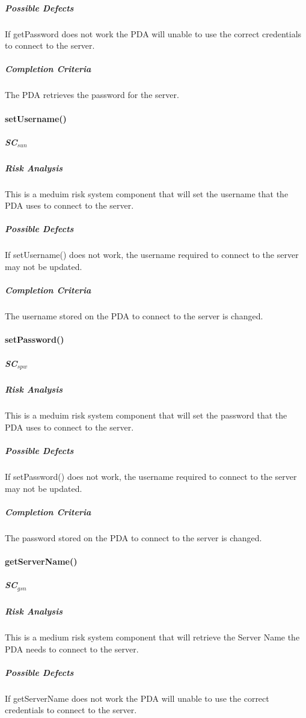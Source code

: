 \documentclass{article}
\begin{document}
\subparagraph{Possible Defects}
If getPassword does not work the PDA will unable to use the correct credentials to connect to the server.

\subparagraph{Completion Criteria}
The PDA retrieves the password for the server.

\paragraph{setUsername()}

\subparagraph{SC$_{sun}$}

\subparagraph{Risk Analysis}
This is a meduim risk system component that will set the username that the PDA uses to connect to the server.

\subparagraph{Possible Defects}
If setUsername() does not work, the username required to connect to the server may not be updated.

\subparagraph{Completion Criteria}
The username stored on the PDA to connect to the server is changed.

\paragraph{setPassword()}

\subparagraph{SC$_{spw}$}

\subparagraph{Risk Analysis}
This is a meduim risk system component that will set the password that the PDA uses to connect to the server.

\subparagraph{Possible Defects}
If setPassword() does not work, the username required to connect to the server may not be updated.

\subparagraph{Completion Criteria}
The password stored on the PDA to connect to the server is changed.

\paragraph{getServerName()}

\subparagraph{SC$_{gsn}$}

\subparagraph{Risk Analysis}
This is a medium risk system component that will retrieve the Server Name the PDA needs to connect to the server.

\subparagraph{Possible Defects}
If getServerName does not work the PDA will unable to use the correct credentials to connect to the server.
\end{document}
